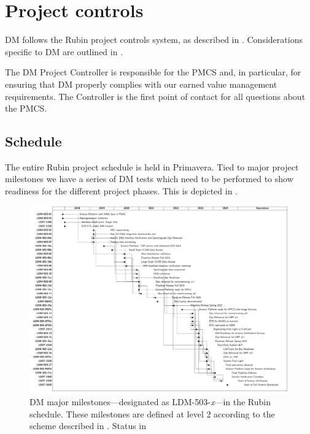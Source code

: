 \newpage
\section{Project controls}\label{sect:dmpc}

DM follows the Rubin project controls system, as described in .
Considerations specific to DM are outlined in .

The DM Project Controller is responsible for the PMCS and, in particular, for ensuring that DM properly complies with our earned value management requirements.
The Controller is the first point of contact for all questions about the PMCS.

\subsection{Schedule}\label{sect:schedule}

The entire Rubin project schedule is held in Primavera.
Tied to major project milestones we have a series of DM tests which need to be performed to show readiness for the different project phases.
This is depicted in .

\begin{figure}[htbp]
	\hspace{-0.5cm}	 \includegraphics[width=1.1\textwidth]{gantt}
		 \caption{DM major milestones---designated as LDM-503-\textit{x}---in
         the Rubin schedule. These milestones are defined at level 2 according
         to the scheme described in . Status in }
         \label{fig:schedule}
 \end{figure}

